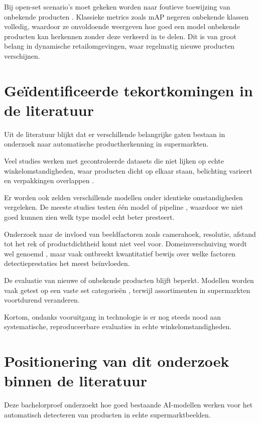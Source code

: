 Bij open-set scenario’s moet gekeken worden naar foutieve toewijzing van onbekende producten \autocite{peng2021rp2klargescaleretailproduct}. Klassieke metrics zoals mAP negeren onbekende klassen volledig, waardoor ze onvoldoende weergeven hoe goed een model onbekende producten kan herkennen zonder deze verkeerd in te delen. Dit is van groot belang in dynamische retailomgevingen, waar regelmatig nieuwe producten verschijnen.

\section{Geïdentificeerde tekortkomingen in de literatuur}
\label{sec:tekortkomingen_lit}

Uit de literatuur blijkt dat er verschillende belangrijke gaten bestaan in onderzoek naar automatische productherkenning in supermarkten.

Veel studies werken met gecontroleerde datasets die niet lijken op echte winkelomstandigheden, waar producten dicht op elkaar staan, belichting varieert en verpakkingen overlappen \autocite{MELEK2024108452}.

Er worden ook zelden verschillende modellen onder identieke omstandigheden vergeleken. De meeste studies testen één model of pipeline \autocite{TONIONI201810733}, waardoor we niet goed kunnen zien welk type model echt beter presteert.

Onderzoek naar de invloed van beeldfactoren zoals camerahoek, resolutie, afstand tot het rek of productdichtheid komt niet veel voor. Domeinverschuiving wordt wel genoemd \autocite{FRANCO2017163}, maar vaak ontbreekt kwantitatief bewijs over welke factoren detectieprestaties het meest beïnvloeden.

De evaluatie van nieuwe of onbekende producten blijft beperkt. Modellen worden vaak getest op een vaste set categorieën \autocite{peng2021rp2klargescaleretailproduct}, terwijl assortimenten in supermarkten voortdurend veranderen.

Kortom, ondanks vooruitgang in technologie is er nog steeds nood aan systematische, reproduceerbare evaluaties in echte winkelomstandigheden.

\section{Positionering van dit onderzoek binnen de literatuur}

Deze bachelorproef onderzoekt hoe goed bestaande AI-modellen werken voor het automatisch detecteren van producten in echte supermarktbeelden.

